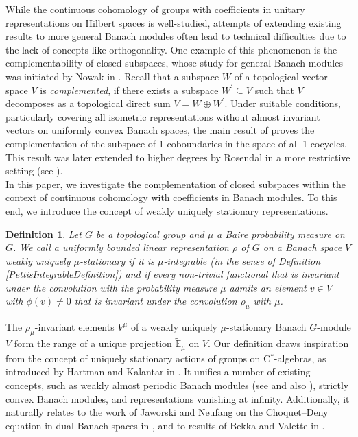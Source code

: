 \documentclass[a4paper,11pt,reqno]{amsart}
\numberwithin{equation}{section}
\newtheorem*{definition*}{Definition}
\theoremstyle{definition}
\theoremstyle{remark}
\theoremstyle{remark}
\begin{document}
While the continuous cohomology of groups with coefficients in unitary representations on Hilbert spaces is well-studied, attempts of extending existing results to more general Banach modules often lead to technical difficulties due to the lack of concepts like orthogonality. One example of this phenomenon is the complementability of closed subspaces, whose study for general Banach modules was initiated by Nowak in \cite{Nowak17}. Recall that a subspace $W$ of a topological vector space $V$ is \emph{complemented}, if there exists a subspace $W^{\prime}\subseteq V$ such that $V$ decomposes as a topological direct sum $V=W\oplus W^{\prime}$. Under suitable conditions, particularly covering all isometric representations without almost invariant vectors on uniformly convex Banach spaces, the main result of \cite{Nowak17} proves the complementation of the subspace of 1-coboundaries in the space of all 1-cocycles. This result was later extended to higher degrees by Rosendal in a more restrictive setting (see \cite{Rosendal22}).\\

In this paper, we investigate the complementation of closed subspaces within the context of continuous cohomology with coefficients in Banach modules. To this end, we introduce the concept of weakly uniquely stationary representations.

\begin{definition*} \emph{Let $G$ be a topological group and $\mu$ a Baire probability measure on $G$. We call a uniformly bounded linear representation $\rho$ of $G$ on a Banach space $V$ \emph{weakly uniquely $\mu$-stationary} if it is $\mu$-integrable (in the sense of Definition \ref{PettisIntegrableDefinition}) and if every non-trivial functional that is invariant under the convolution with the probability measure $\mu$ admits an element $v\in V$ with $\phi(v)\neq0$ that is invariant under the convolution $\rho_{\mu}$ with $\mu$.} \end{definition*}

The $\rho_{\mu}$-invariant elements $V^{\mu}$ of a weakly uniquely $\mu$-stationary Banach $G$-module $V$ form the range of a unique projection $\widetilde{\mathbb{E}}_{\mu}$ on $V$. Our definition draws inspiration from the concept of uniquely stationary actions of groups on C$^{\ast}$-algebras, as introduced by Hartman and Kalantar in \cite{HartmanKalantar}. It unifies a number of existing concepts, such as weakly almost periodic Banach modules (see \cite{BaderRosendalSauer} and also \cite{CornulierTessera20}), strictly convex Banach modules, and representations vanishing at infinity. Additionally, it naturally relates to the work of Jaworski and Neufang on the Choquet--Deny equation in dual Banach spaces in \cite{JaworskiNeufang}, and to results of Bekka and Valette in \cite{BekkaValette97}.
\end{document}

